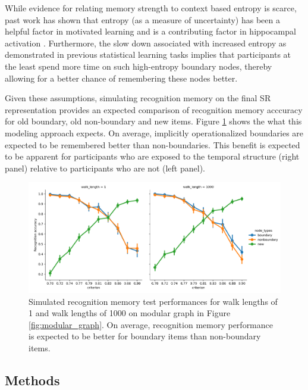 While evidence for relating memory strength to context based entropy is scarce, past work has shown that entropy (as a measure of uncertainty) has been a helpful factor in motivated learning and is a contributing factor in hippocampal activation \cite{davis2012striatal}. Furthermore, the slow down associated with increased entropy as demonstrated in previous statistical learning tasks \cite{lynn2020abstract,lynn2020human,lynn2020humans} implies that participants at the least spend more time on such high-entropy boundary nodes, thereby allowing for a better chance of remembering these nodes better. 

Given these assumptions, simulating recognition memory on the final SR representation provides an expected comparison of recognition memory acccuracy for old boundary, old non-boundary and new items. Figure \ref{fig:recog_memory_sims_with_criterion} shows the what this modeling approach expects. On average, implicitly operationalized boundaries are expected to be remembered better than non-boundaries. This benefit is expected to be apparent for participants who are exposed to the temporal structure (right panel) relative to participants who are not (left panel).

\begin{figure}[ht]
    \centering
    \includegraphics[width = \textwidth]{chapter_notebooks/chapter_3/figures/recog_memory_with_criterion.png}
    \caption{Simulated recognition memory test performances for walk lengths of 1 and walk lengths of 1000 on modular graph in Figure \ref{fig:modular_graph}. On average, recognition memory performance is expected to be better for boundary items than non-boundary items.}
    \label{fig:recog_memory_sims_with_criterion}
\end{figure}



\subsection{Methods}
